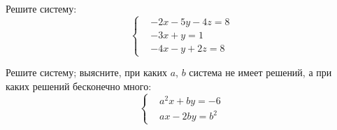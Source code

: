 %
%


\begin{problems}

\item
Решите систему:
\[\left\{\begin{aligned}&
    - 2 x - 5 y - 4 z = 8
\\&
    - 3 x + y = 1
\\&
    - 4 x - y + 2 z = 8
\end{aligned}\right.\]

\item
Решите систему; выясните, при каких $a$, $b$ система не имеет решений, а при
каких решений бесконечно много:
\[\left\{\begin{aligned}&
    a^2 x + b y = -6
\\&
    a x - 2 b y = b^2
\end{aligned}\right.\]

\end{problems}

